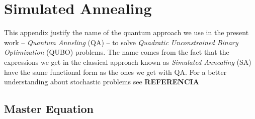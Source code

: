 
\chapter{Simulated Annealing} %

This appendix justify the name of the quantum approach we use in the present work -- \textit{Quantum Anneling} (QA) -- to solve \textit{Quadratic Unconstrained Binary Optimization} (QUBO) problems. The name comes from the fact that the expressions we get in the classical approach known as \textit{Simulated Annealing} (SA) have the same functional form as the ones we get with QA. For a better understanding about stochastic problems see \textbf{REFERENCIA} \\
\label{AppendixB} %
\section{Master Equation}
